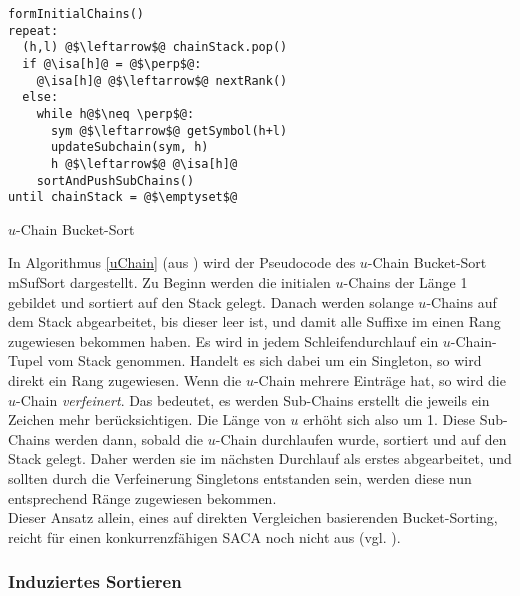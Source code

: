 \begin{listing}[htp]
\begin{verbatim}
formInitialChains()
repeat:
  (h,l) @$\leftarrow$@ chainStack.pop()	
  if @\isa[h]@ = @$\perp$@:
    @\isa[h]@ @$\leftarrow$@ nextRank()		
  else:
    while h@$\neq \perp$@:
      sym @$\leftarrow$@ getSymbol(h+l)
      updateSubchain(sym, h)
      h @$\leftarrow$@ @\isa[h]@
    sortAndPushSubChains()	
until chainStack = @$\emptyset$@			
\end{verbatim}
\caption{$u$-Chain Bucket-Sort}
\label{uChain}
\end{listing}

In Algorithmus \ref{uChain} (aus \cite{saca:8}) wird der Pseudocode des $u$-Chain Bucket-Sort mSufSort dargestellt.
Zu Beginn werden die initialen $u$-Chains der Länge 1 gebildet und sortiert auf den Stack gelegt. Danach werden solange $u$-Chains auf dem Stack abgearbeitet, bis dieser leer ist, und damit alle Suffixe im \isa einen Rang zugewiesen bekommen haben.
Es wird in jedem Schleifendurchlauf ein $u$-Chain-Tupel vom Stack genommen. Handelt es sich dabei um ein Singleton, so wird direkt ein Rang zugewiesen. Wenn die $u$-Chain mehrere Einträge hat, so wird die $u$-Chain \textit{verfeinert}. Das bedeutet, es werden Sub-Chains erstellt die jeweils ein Zeichen mehr berücksichtigen. Die Länge von $u$ erhöht sich also um 1. Diese Sub-Chains werden dann, sobald die $u$-Chain durchlaufen wurde, sortiert und auf den Stack gelegt. Daher werden sie im nächsten Durchlauf als erstes abgearbeitet, und sollten durch die Verfeinerung Singletons entstanden sein, werden diese nun entsprechend Ränge zugewiesen bekommen.\\

Dieser Ansatz allein, eines auf direkten Vergleichen basierenden Bucket-Sorting, reicht für einen konkurrenzfähigen SACA noch nicht aus (vgl. \cite{seward2000}).

\subsubsection{Induziertes Sortieren}

